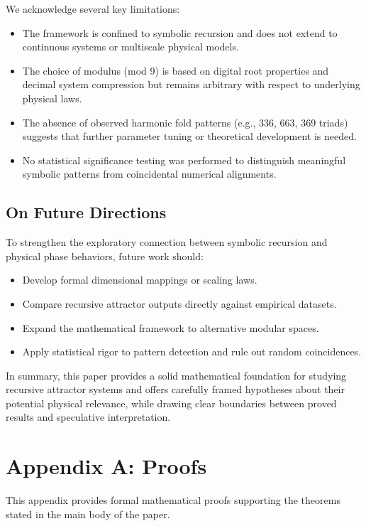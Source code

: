 \documentclass[12pt]{article}
\begin{document}
We acknowledge several key limitations:
\begin{itemize}
    \item The framework is confined to symbolic recursion and does not extend to continuous systems or multiscale physical models.
    \item The choice of modulus (mod 9) is based on digital root properties and decimal system compression but remains arbitrary with respect to underlying physical laws.
    \item The absence of observed harmonic fold patterns (e.g., 336, 663, 369 triads) suggests that further parameter tuning or theoretical development is needed.
    \item No statistical significance testing was performed to distinguish meaningful symbolic patterns from coincidental numerical alignments.
\end{itemize}

\subsection{On Future Directions}

To strengthen the exploratory connection between symbolic recursion and physical phase behaviors, future work should:
\begin{itemize}
    \item Develop formal dimensional mappings or scaling laws.
    \item Compare recursive attractor outputs directly against empirical datasets.
    \item Expand the mathematical framework to alternative modular spaces.
    \item Apply statistical rigor to pattern detection and rule out random coincidences.
\end{itemize}

\bigskip

In summary, this paper provides a solid mathematical foundation for studying recursive attractor systems and offers carefully framed hypotheses about their potential physical relevance, while drawing clear boundaries between proved results and speculative interpretation.

\newpage
\appendix
\section{Appendix A: Proofs}

This appendix provides formal mathematical proofs supporting the theorems stated in the main body of the paper.
\end{document}

